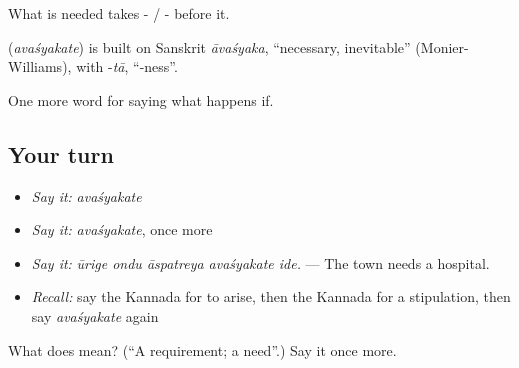 What is needed takes - / - before it.

\begin{cousinweb}
\textbf{} (\emph{avaśyakate}) is built on Sanskrit \emph{āvaśyaka}, \textquotedblleft{}necessary, inevitable\textquotedblright{} (Monier-Williams), with -\emph{tā}, \textquotedblleft{}-ness\textquotedblright{}.
\end{cousinweb}

\begin{grammarlens}[title={What you've built}]
One more word for saying what happens if.
\end{grammarlens}

\subsection*{Your turn}
\begin{itemize}
\raggedright
  \item \emph{Say it:} \emph{avaśyakate}
  \item \emph{Say it:} \emph{avaśyakate}, once more
  \item \emph{Say it:} \emph{ūrige ondu āspatreya avaśyakate ide.} — The town needs a hospital.
  \item \emph{Recall:} say the Kannada for to arise, then the Kannada for a stipulation, then say \emph{avaśyakate} again
\end{itemize}

\begin{tcolorbox}[breakable,colback=teal!4,colframe=teal!35!black,title={Before you move on}]
What does  mean? (\textquotedblleft{}A requirement; a need\textquotedblright{}.) Say it once more.
\end{tcolorbox}
